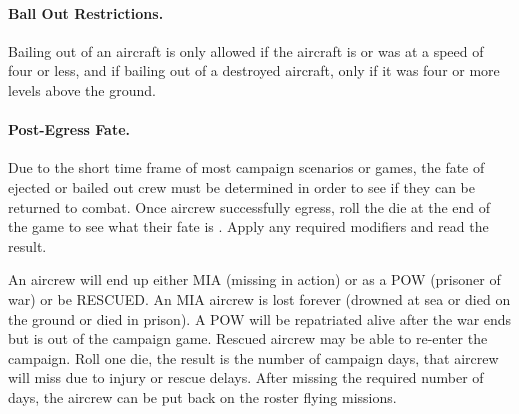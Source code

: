 \begin{advancedrules}
\paragraph{Ball Out Restrictions.} Bailing out of an aircraft is only allowed if the aircraft is or was at a speed of four or less, and if bailing out of a destroyed aircraft, only if it was four or more levels above the ground. 


\paragraph{Post-Egress Fate.\label{rule:post-egress-fate}} Due to the short time frame of most campaign scenarios or games, the fate of ejected or bailed out crew must be determined in order to see if they can be returned to combat. Once aircrew successfully egress, roll the die at the end of the game to see what their fate is . Apply any required modifiers and read the result.

An aircrew will end up either MIA (missing in action) or as a POW (prisoner of war) or be RESCUED. An MIA aircrew is lost forever (drowned at sea or died on the ground or died in prison). A POW will be repatriated alive after the war ends but is out of the campaign game. Rescued aircrew may be able to re-enter the campaign. Roll one die, the result is the number of campaign days, that aircrew will miss due to injury or rescue delays. After missing the required number of days, the aircrew can be put back on the roster flying missions.

\end{advancedrules}
